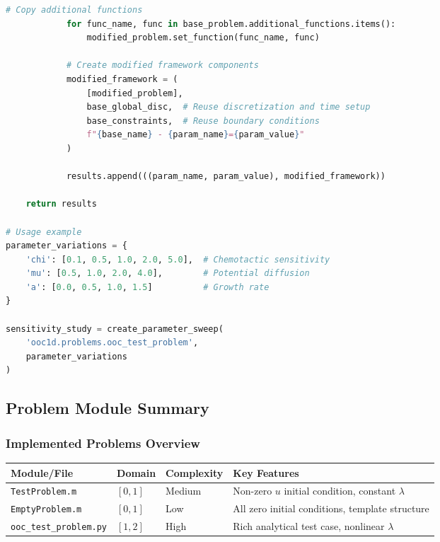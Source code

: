 \begin{lstlisting}[language=Python, caption=Parameter Sensitivity Analysis Pattern]
            # Copy additional functions
            for func_name, func in base_problem.additional_functions.items():
                modified_problem.set_function(func_name, func)
            
            # Create modified framework components
            modified_framework = (
                [modified_problem],
                base_global_disc,  # Reuse discretization and time setup
                base_constraints,  # Reuse boundary conditions
                f"{base_name} - {param_name}={param_value}"
            )
            
            results.append(((param_name, param_value), modified_framework))
    
    return results

# Usage example
parameter_variations = {
    'chi': [0.1, 0.5, 1.0, 2.0, 5.0],  # Chemotactic sensitivity
    'mu': [0.5, 1.0, 2.0, 4.0],        # Potential diffusion
    'a': [0.0, 0.5, 1.0, 1.5]          # Growth rate
}

sensitivity_study = create_parameter_sweep(
    'ooc1d.problems.ooc_test_problem',
    parameter_variations
)
\end{lstlisting}

\subsection{Problem Module Summary}
\label{subsec:problem_module_summary_detailed}

\subsubsection{Implemented Problems Overview}

\begin{longtable}{|p{4.5cm}|p{2cm}|p{3cm}|p{4.5cm}|}
\hline
\textbf{Module/File} & \textbf{Domain} & \textbf{Complexity} & \textbf{Key Features} \\
\hline
\endhead

\texttt{TestProblem.m} & $[0,1]$ & Medium & Non-zero $u$ initial condition, constant $\lambda$ \\
\hline

\texttt{EmptyProblem.m} & $[0,1]$ & Low & All zero initial conditions, template structure \\
\hline

\texttt{ooc\_test\_problem.py} & $[1,2]$ & High & Rich analytical test case, nonlinear $\lambda$ \\
\hline

\end{longtable}


